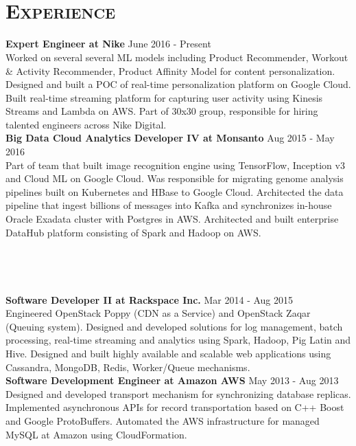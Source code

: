 \begin{resume}
\begin{formatb}
  \\
  \body\\
\end{formatb}

\section{\textsc{Experience}}
\textbf{Expert Engineer at Nike} \hfill June 2016 - Present\\
Worked on several several ML models including Product Recommender, Workout \& Activity Recommender, Product Affinity Model for content personalization. Designed and built a POC of real-time personalization platform on Google Cloud. Built real-time streaming platform for capturing user activity using Kinesis Streams and Lambda on AWS. Part of 30x30 group, responsible for hiring talented engineers across Nike Digital.\\
\textbf{Big Data Cloud Analytics Developer IV at Monsanto} \hfill Aug 2015 - May 2016\\
Part of team that built image recognition engine using TensorFlow, Inception v3 and Cloud ML on Google Cloud. Was responsible for migrating genome analysis pipelines built on Kubernetes and HBase to Google Cloud. Architected the data pipeline that ingest billions of messages into Kafka and synchronizes in-house Oracle Exadata cluster with Postgres in AWS. Architected and built enterprise DataHub platform consisting of Spark and Hadoop on AWS.\\ \\ \\ \\ \\ 
\textbf{Software Developer II at Rackspace Inc.} \hfill Mar 2014 - Aug 2015\\
Engineered OpenStack Poppy (CDN as a Service) and OpenStack Zaqar (Queuing system). Designed and developed solutions for log management, batch processing, real-time streaming and analytics using Spark, Hadoop, Pig Latin and Hive. Designed and built highly available and scalable web applications using Cassandra, MongoDB, Redis, Worker/Queue mechanisms.\\
\textbf{Software Development Engineer at Amazon AWS} \hfill May 2013 - Aug 2013\\
Designed and developed transport mechanism for synchronizing database replicas. Implemented asynchronous APIs for record transportation based on C++ Boost and Google ProtoBuffers. Automated the AWS infrastructure for managed MySQL at Amazon using CloudFormation.\\

\end{resume}

